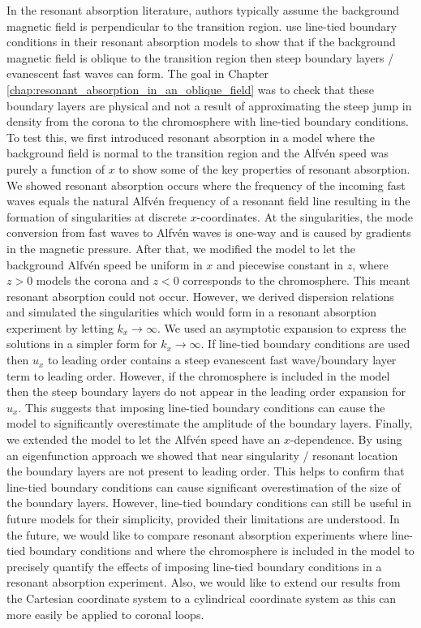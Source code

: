 In the resonant absorption literature, authors typically assume the background magnetic field is perpendicular to the transition region. \citet{Halberstadt1993,Halberstadt1995,Arregui2003} use line-tied boundary conditions in their resonant absorption models to show that if the background magnetic field is oblique to the transition region then steep boundary layers / evanescent fast waves can form. The goal in Chapter \ref{chap:resonant_absorption_in_an_oblique_field} was to check that these boundary layers are physical and not a result of approximating the steep jump in density from the corona to the chromosphere with line-tied boundary conditions. To test this, we first introduced resonant absorption in a model where the background field is normal to the transition region and the Alfv\'en speed was purely a function of $x$ to show some of the key properties of resonant absorption. We showed resonant absorption occurs where the frequency of the incoming fast waves equals the natural Alfv\'en frequency of a resonant field line resulting in the formation of singularities at discrete $x$-coordinates. At the singularities, the mode conversion from fast waves to Alfv\'en waves is one-way and is caused by gradients in the magnetic pressure. After that, we modified the model to let the background Alfv\'en speed be uniform in $x$ and piecewise constant in $z$, where $z>0$ models the corona and $z<0$ corresponds to the chromosphere. This meant resonant absorption could not occur. However, we derived dispersion relations and simulated the singularities which would form in a resonant absorption experiment by letting $k_x\rightarrow \infty$. We used an asymptotic expansion to express the solutions in a simpler form for $k_x\rightarrow \infty$. If line-tied boundary conditions are used then $u_x$ to leading order contains a steep evanescent fast wave/boundary layer term to leading order. However, if the chromosphere is included in the model then the steep boundary layers do not appear in the leading order expansion for $u_x$. This suggests that imposing line-tied boundary conditions can cause the model to significantly overestimate the amplitude of the boundary layers. Finally, we extended the model to let the Alfv\'en speed have an $x$-dependence. By using an eigenfunction approach we showed that near singularity / resonant location the boundary layers are not present to leading order. This helps to confirm that line-tied boundary conditions can cause significant overestimation of the size of the boundary layers. However, line-tied boundary conditions can still be useful in future models for their simplicity, provided their limitations are understood. In the future, we would like to compare resonant absorption experiments where line-tied boundary conditions and where the chromosphere is included in the model to precisely quantify the effects of imposing line-tied boundary conditions in a resonant absorption experiment. Also, we would like to extend our results from the Cartesian coordinate system to a cylindrical coordinate system as this can more easily be applied to coronal loops.

